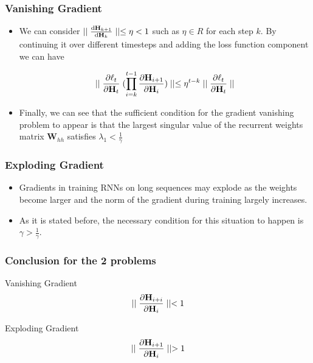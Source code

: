 \documentclass[
	11pt,
]{beamer}
\begin{document}
\begin{frame}
	\frametitle{Vanishing Gradient}
	\begin{itemize}
		\item We can consider $\mid\mid \dv{\mathbf{H}_{k+1}}{\mathbf{H}_k} \mid\mid \le \eta < 1$ such as $\eta \in R$ for each
		step $k$. By continuing it over different timesteps and adding
		the loss function component we can have
		\bigskip
	\begin{block}{}
		\begin{equation*}
			\mid\mid \pdv{\ell_t}{\mathbf{H}_t} \; (\prod_{i=k}^{t-1} \pdv{\mathbf{H}_{i+1}}{\mathbf{H}_i}) \mid\mid \le \eta^{t-k} \mid\mid \pdv{\ell_t}{\mathbf{H}_t} \mid\mid
		\end{equation*}
	\end{block}
		\bigskip
		\item Finally, we can see that the sufficient condition for
		the gradient vanishing problem to appear is that the largest
		singular value of the recurrent weights matrix $\mathbf{W}_{hh}$
		satisfies $\lambda_1 < \frac{1}{\gamma}$
\end{itemize}
\end{frame}

\begin{frame}
	\frametitle{Exploding Gradient}
	\begin{itemize}
		\item Gradients in training RNNs on long sequences
		may explode as the weights become larger and the norm of
		the gradient during training largely increases.
		\bigskip
		\item  As it is stated before, the necessary condition for this situation to happen is
		$\gamma > \frac{1}{\gamma}$.
	\end{itemize}
\end{frame}

\begin{frame}
	\frametitle{Conclusion for the 2 problems}
	\begin{block}{Vanishing Gradient}
		\begin{equation*}
			 \mid \mid \pdv{\mathbf{H}_{i+i}}{\mathbf{H}_i} \mid \mid  < 1
		\end{equation*}
	\end{block}
	\bigskip
	\bigskip
	\begin{block}{Exploding Gradient}
		\begin{equation*}
			\mid \mid \pdv{\mathbf{H}_{i+1}}{\mathbf{H}_i} \mid \mid  > 1
		\end{equation*}
	\end{block}
\end{frame}
\end{document}
